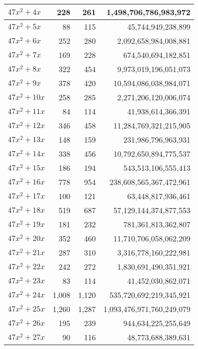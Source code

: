 \documentclass[a4paper]{amsproc}
\theoremstyle{plain}
\begin{document}
\begin{longtable}{ | l | r | r | r | }
$47x^2 + 4x$ & 228 & 261 & 1{,}498{,}706{,}786{,}983{,}972 \\ \hline
$47x^2 + 5x$ & 88 & 115 & 45{,}744{,}949{,}238{,}899 \\ \hline
$47x^2 + 6x$ & 252 & 280 & 2{,}092{,}658{,}984{,}008{,}881 \\ \hline
$47x^2 + 7x$ & 169 & 228 & 674{,}540{,}694{,}182{,}851 \\ \hline
$47x^2 + 8x$ & 322 & 454 & 9{,}973{,}019{,}196{,}051{,}073 \\ \hline
$47x^2 + 9x$ & 378 & 420 & 10{,}594{,}086{,}038{,}984{,}071 \\ \hline
$47x^2 + 10x$ & 258 & 285 & 2{,}271{,}206{,}120{,}006{,}074 \\ \hline
$47x^2 + 11x$ & 84 & 114 & 41{,}938{,}614{,}366{,}391 \\ \hline
$47x^2 + 12x$ & 346 & 458 & 11{,}284{,}769{,}321{,}215{,}905 \\ \hline
$47x^2 + 13x$ & 148 & 159 & 231{,}986{,}796{,}963{,}931 \\ \hline
$47x^2 + 14x$ & 338 & 456 & 10{,}792{,}650{,}894{,}775{,}537 \\ \hline
$47x^2 + 15x$ & 186 & 194 & 543{,}513{,}106{,}555{,}413 \\ \hline
$47x^2 + 16x$ & 778 & 954 & 238{,}608{,}565{,}367{,}472{,}961 \\ \hline
$47x^2 + 17x$ & 100 & 121 & 63{,}448{,}817{,}936{,}461 \\ \hline
$47x^2 + 18x$ & 519 & 687 & 57{,}129{,}144{,}374{,}877{,}553 \\ \hline
$47x^2 + 19x$ & 181 & 232 & 781{,}361{,}813{,}362{,}807 \\ \hline
$47x^2 + 20x$ & 352 & 460 & 11{,}710{,}706{,}058{,}062{,}209 \\ \hline
$47x^2 + 21x$ & 287 & 310 & 3{,}316{,}778{,}160{,}222{,}981 \\ \hline
$47x^2 + 22x$ & 242 & 272 & 1{,}830{,}691{,}490{,}351{,}921 \\ \hline
$47x^2 + 23x$ & 83 & 114 & 41{,}452{,}030{,}862{,}071 \\ \hline
$47x^2 + 24x$ & 1{,}008 & 1{,}120 & 535{,}720{,}692{,}219{,}345{,}921 \\ \hline
$47x^2 + 25x$ & 1{,}260 & 1{,}287 & 1{,}093{,}476{,}971{,}760{,}249{,}079 \\ \hline
$47x^2 + 26x$ & 195 & 239 & 944{,}634{,}225{,}255{,}649 \\ \hline
$47x^2 + 27x$ & 90 & 116 & 48{,}773{,}688{,}389{,}631 \\ \hline

\end{longtable}
\end{document}
